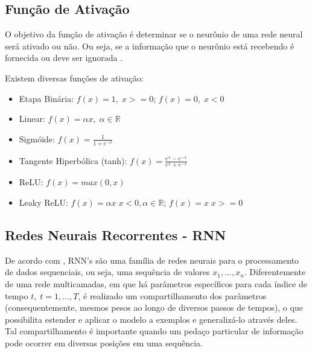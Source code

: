 \documentclass{automatextcc}
\begin{document}
\subsection{Função de Ativação}
O objetivo da função de ativação é determinar se o neurônio de uma rede neural será ativado ou não. Ou seja, se a informação que o neurônio está recebendo é fornecida ou deve ser ignorada \citep{dsa2021deeplearningbook}.

Existem diversas funções de ativação:

\begin{itemize}
    \item Etapa Binária: $f(x) = 1, \; x>=0$; $f(x) = 0, \; x<0$ 
    \item Linear: $f(x) = \alpha x, \; \alpha \in \mathbb{R}$
    \item Sigmóide: $f(x) = \frac{1}{1+e^{-x}}$ 
    \item Tangente Hiperbólica (tanh): $f(x) = \frac{e^{x}-e^{-x}}{e^{x}+e^{-x}}$
    \item ReLU: $f(x) = max(0,x)$
    \item Leaky ReLU: $f(x) = \alpha x \; x<0, \alpha \in \mathbb{R}$; $f(x) = x \; x>=0$
\end{itemize}



\subsection{Redes Neurais Recorrentes - RNN}
De acordo com \citet{mit2016deeplearningbook}, RNN's são uma família de redes neurais para o processamento de dados sequenciais, ou seja, uma sequência de valores $x_1,\dots,x_n$. Diferentemente de uma rede multicamadas, em que há parâmetros específicos para cada índice de tempo $t, \; t=1,\dots,T$, é realizado um compartilhamento dos parâmetros (consequentemente, mesmos pesos ao longo de diversos passos de tempos), o que possibilita estender e aplicar o modelo a exemplos e generalizá-lo através deles. Tal compartilhamento é importante quando um pedaço particular de informação pode ocorrer em diversas posições em uma sequência. 

\end{document}
